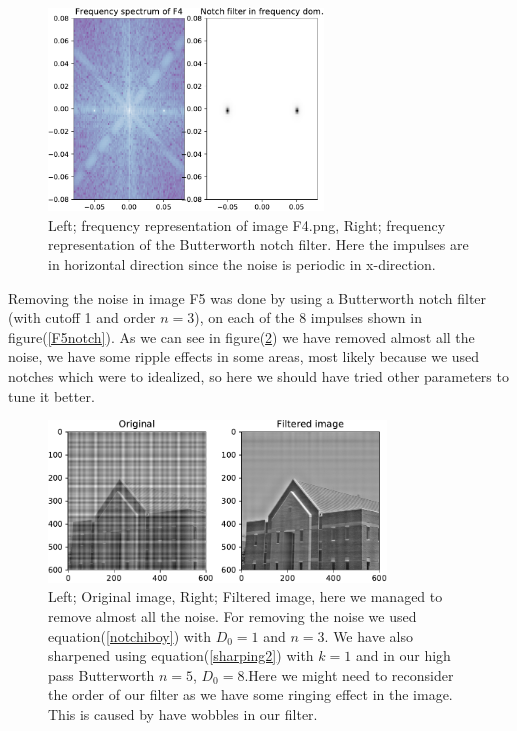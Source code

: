 {    \begin{figure}[!htb]
        {\centering
            \includegraphics[width=0.65\textwidth]{C7F4freq.pdf}
            \caption{Left; frequency representation of image F4.png, Right; frequency representation of the Butterworth notch filter. Here the impulses are in horizontal direction since the noise is periodic in x-direction.}
            \label{C7F4freq}
        \par}
        \end{figure}


Removing the noise in image F5 was done by using a Butterworth notch filter (with cutoff 1 and order $n = 3$), on each of the 8 impulses shown in figure(\ref{F5notch}). As we can see in figure(\ref{C7F5}) we have removed almost all the noise, we have some ripple effects in some areas, most likely because we used notches which were to idealized, so here we should have tried other parameters to tune it better.


\begin{figure}[!htb]
    {\centering
        \includegraphics[width=0.80\textwidth]{C7F5.pdf}
        \caption{Left; Original image, Right; Filtered image, here we managed to remove almost all the noise. For removing the noise we used equation(\ref{notchiboy}) with $D_{0} = 1$ and $n = 3$. We have also sharpened using equation(\ref{sharping2}) with $k = 1$ and in our high pass Butterworth $n = 5$, $D_{0} = 8$.Here we might need to reconsider the order of our filter as we have some ringing effect in the image. This is caused by have wobbles in our filter.}
        \label{C7F5}
    \par}
    \end{figure}

}
